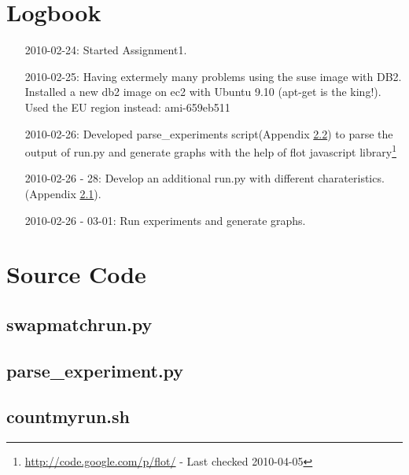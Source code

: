 \clearpage
\chapter{Logbook}
\begin{itemize}
  \item[2010-02-24:] Started Assignment1.
  \item[2010-02-25:] Having extermely many problems using the suse image with
    DB2. Installed a new db2 image on ec2 with Ubuntu 9.10 (apt-get is the
    king!). Used the EU region instead: ami-659eb511
  \item[2010-02-26:] Developed parse\_experiments script(Appendix
    \ref{app:parseexperiment.py}) to parse the output of run.py and generate
    graphs with the help of flot javascript
    library\footnote{\url{http://code.google.com/p/flot/} - Last checked
    2010-04-05}
  \item[2010-02-26 - 28:] Develop an additional run.py with different
    charateristics.(Appendix \ref{app:swmr.py}).
  \item[2010-02-26 - 03-01:] Run experiments and generate graphs.
\end{itemize}
\appendix

\chapter{Source Code}

\section{swapmatchrun.py}\label{app:swmr.py}


\section{parse\_experiment.py}\label{app:parseexperiment.py}



\section{countmyrun.sh}\label{app:countmyrun.sh}



